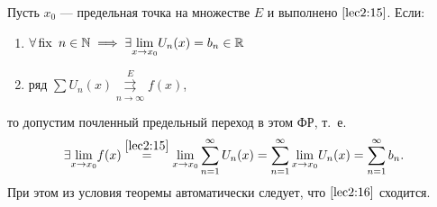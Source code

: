 \documentclass[../../main.tex]{subfiles}
\begin{document}
\begin{thm}
Пусть $x_0$ --- предельная точка на множестве $E$ и выполнено 
$\eqref{lec2:15}$. Если: 
\begin{enumerate}
	\item $\forall \operatorname{fix} \ n \in \mathbb{N} \implies
\exists \underset{x \to x_0}{\lim} U_n(x) = b_n \in \mathbb{R}$
	\item ряд $\sum U_n(x) \overset{E}
	{\underset{n \to \infty}\rightrightarrows} f(x)$,
\end{enumerate}
то допустим почленный предельный переход в этом ФР, т.~е.
\begin{equation}
\label{lec2:16}
\exists \underset{x \to x_0}{\lim} f(x) \overset{\eqref{lec2:15}}{=}
\underset{x \to x_0}{\lim} \sum\limits_{n = 1}^{\infty} U_n(x) =
\sum\limits_{n = 1}^{\infty} \underset{x \to x_0}{\lim} U_n(x) =
\sum\limits_{n = 1}^{\infty} b_n.
\end{equation}	
При этом из условия теоремы автоматически следует, 
что $\eqref{lec2:16}$ сходится.
\end{thm}	
\end{document}
